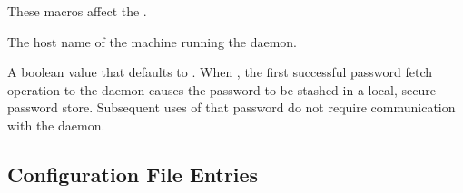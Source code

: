 These macros affect the .

\begin{description}

\label{param:CreddHost}
\item[\Macro{CREDD\_HOST}]
  The host name of the machine running the  daemon.

\label{param:CreddCacheLocally}
\item[\Macro{CREDD\_CACHE\_LOCALLY}]
  A boolean value that defaults to .
  When , the first successful password fetch operation to the
   daemon causes the password to be stashed in a local, 
  secure password store.
  Subsequent uses of that password do not require
  communication with the  daemon.

\end{description}


\subsection{\label{sec:Gridmanager-Config-File-Entries}
Configuration File Entries}

